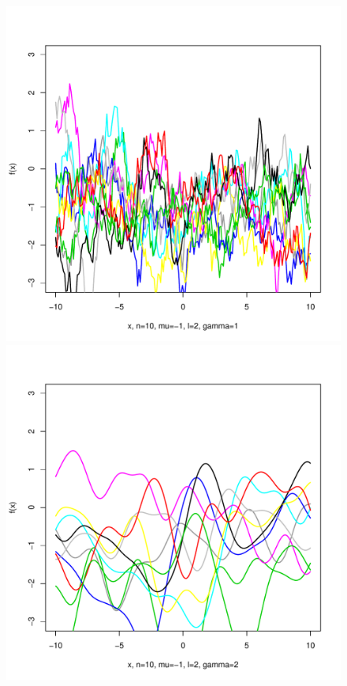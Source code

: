 \documentclass[12pt,letterpaper]{article}
\begin{document}
\begin{figure}
\begin{center}
\includegraphics[scale=0.2]{hw321/n10-m-1-l2-g2.pdf}
\includegraphics[scale=0.2]{hw321/n10-m-1-l2-g4.pdf}

\end{center}
\end{figure}
\end{document}
